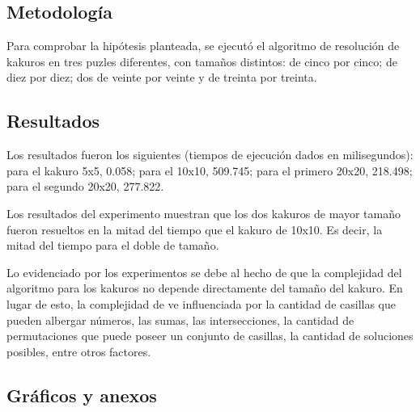 \documentclass[conference]{IEEEtran}
\begin{document}
    
    
\subsection*{Metodología}

    Para comprobar la hipótesis planteada, se ejecutó el algoritmo de resolución de kakuros en tres puzles diferentes, con tamaños distintos: de cinco por cinco; de diez por diez; dos de veinte por veinte y de treinta por treinta.\newline
    
\subsection*{Resultados}

    Los resultados fueron los siguientes (tiempos de ejecución dados en milisegundos): para el kakuro 5x5, 0.058; para el 10x10, 509.745; para el primero 20x20, 218.498; para el segundo 20x20, 277.822.\newline
    
    Los resultados del experimento muestran que los dos kakuros de mayor tamaño fueron resueltos en la mitad del tiempo que el kakuro de 10x10. Es decir, la mitad del tiempo para el doble de tamaño.\newline
    
    Lo evidenciado por los experimentos se debe al hecho de que la complejidad del algoritmo para los kakuros no depende directamente del tamaño del kakuro. En lugar de esto, la complejidad de ve influenciada por la cantidad de casillas que pueden albergar números, las sumas, las intersecciones, la cantidad de permutaciones que puede poseer un conjunto de casillas, la cantidad de soluciones posibles, entre otros factores.\newline
    

    
\subsection*{Gráficos y anexos}


\end{document}
